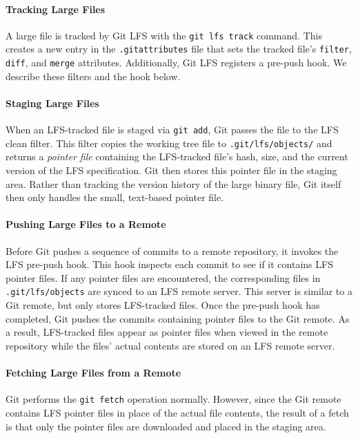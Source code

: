\documentclass[nohyperref]{article}
\def\code#1{\texttt{#1}}
\theoremstyle{plain}
\theoremstyle{definition}
\theoremstyle{remark}
\begin{document}
\paragraph{Tracking Large Files}
A large file is tracked by Git LFS with the \code{git lfs track} command. This creates a new entry in the \code{.gitattributes} file that sets the tracked file's \code{filter}, \code{diff}, and \code{merge} attributes. Additionally, Git LFS registers a pre-push hook. We describe these filters and the hook below.

\paragraph{Staging Large Files}
When an LFS-tracked file is staged via \code{git add}, Git passes the file to the LFS clean filter. This filter copies the working tree file to \code{.git/lfs/objects/} and returns a \emph{pointer file} containing the LFS-tracked file's hash, size, and the current version of the LFS specification. Git then stores this pointer file in the staging area. Rather than tracking the version history of the large binary file, Git itself then only handles the small, text-based pointer file.

\paragraph{Pushing Large Files to a Remote}
Before Git pushes a sequence of commits to a remote repository, it invokes the LFS pre-push hook. This hook inspects each commit to see if it contains LFS pointer files. If any pointer files are encountered, the corresponding files in \code{.git/lfs/objects} are synced to an LFS remote server. This server is similar to a Git remote, but only stores LFS-tracked files. 
Once the pre-push hook has completed, Git pushes the commits containing pointer files to the Git remote. As a result, LFS-tracked files appear as pointer files when viewed in the remote repository while the files' actual contents are stored on an LFS remote server.

\paragraph{Fetching Large Files from a Remote}
Git performs the \code{git fetch} operation normally. However, since the Git remote contains LFS pointer files in place of the actual file contents, the result of a fetch is that only the pointer files are downloaded and placed in the staging area.
\end{document}
